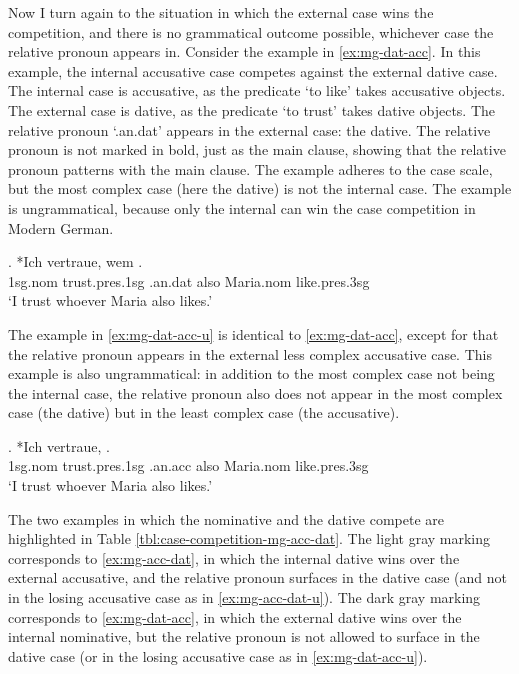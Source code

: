 Now I turn again to the situation in which the external case wins the competition, and there is no grammatical outcome possible, whichever case the relative pronoun appears in.
Consider the example in \ref{ex:mg-dat-acc}. In this example, the internal accusative case competes against the external dative case.
The internal case is accusative, as the predicate  `to like' takes accusative objects.
The external case is dative, as the predicate  `to trust' takes dative objects.
The relative pronoun  `.\ac{an}.\ac{dat}' appears in the external case: the dative. The relative pronoun is not marked in bold, just as the main clause, showing that the relative pronoun patterns with the main clause.
The example adheres to the case scale, but the most complex case (here the dative) is not the internal case. The example is ungrammatical, because only the internal can win the case competition in Modern German.

\exg. *Ich vertraue, wem   . \\
1\ac{sg}.\ac{nom} trust.\ac{pres}.1\ac{sg}\scsub{[dat]} .\ac{an}.\ac{dat} also Maria.\ac{nom} like.\ac{pres}.3\ac{sg}\scsub{[acc]}\\
`I trust whoever Maria also likes.' \label{ex:mg-dat-acc}

The example in \ref{ex:mg-dat-acc-u} is identical to \ref{ex:mg-dat-acc}, except for that the relative pronoun appears in the external less complex accusative case. This example is also ungrammatical: in addition to the most complex case not being the internal case, the relative pronoun also does not appear in the most complex case (the dative) but in the least complex case (the accusative).

\exg. *Ich vertraue,    . \\
1\ac{sg}.\ac{nom} trust.\ac{pres}.1\ac{sg}\scsub{[dat]} .\ac{an}.\ac{acc} also Maria.\ac{nom} like.\ac{pres}.3\ac{sg}\scsub{[acc]}\\
`I trust whoever Maria also likes.' \label{ex:mg-dat-acc-u}

The two examples in which the nominative and the dative compete are highlighted in Table \ref{tbl:case-competition-mg-acc-dat}.
The light gray marking corresponds to \ref{ex:mg-acc-dat}, in which the internal dative wins over the external accusative, and the relative pronoun surfaces in the dative case (and not in the losing accusative case as in \ref{ex:mg-acc-dat-u}).
The dark gray marking corresponds to \ref{ex:mg-dat-acc}, in which the external dative wins over the internal nominative, but the relative pronoun is not allowed to surface in the dative case (or in the losing accusative case as in \ref{ex:mg-dat-acc-u}).

